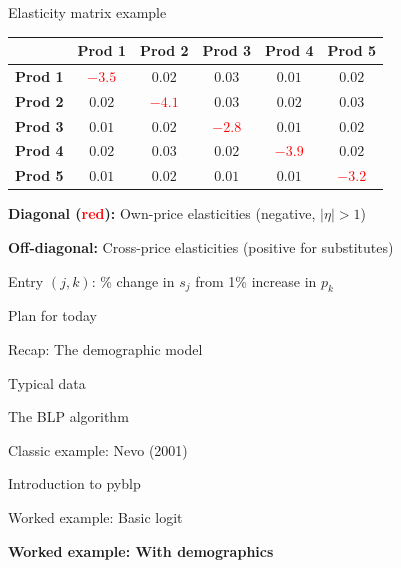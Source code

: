 \documentclass[notes,11pt, aspectratio=169]{beamer}
\newenvironment{wideitemize}{\itemize\addtolength{\itemsep}{10pt}}{\enditemize}
\newenvironment{wideenumerate}{\enumerate\addtolength{\itemsep}{10pt}}{\endenumerate}
\begin{document}
\begin{frame}{Elasticity matrix example}
	\begin{center}
		\small
		\begin{tabular}{l|ccccc}
			& \textbf{Prod 1} & \textbf{Prod 2} & \textbf{Prod 3} & \textbf{Prod 4} & \textbf{Prod 5} \\
			\hline
			\textbf{Prod 1} & \textcolor{red}{$-3.5$} & $0.02$ & $0.03$ & $0.01$ & $0.02$ \\
			\textbf{Prod 2} & $0.02$ & \textcolor{red}{$-4.1$} & $0.03$ & $0.02$ & $0.03$ \\
			\textbf{Prod 3} & $0.01$ & $0.02$ & \textcolor{red}{$-2.8$} & $0.01$ & $0.02$ \\
			\textbf{Prod 4} & $0.02$ & $0.03$ & $0.02$ & \textcolor{red}{$-3.9$} & $0.02$ \\
			\textbf{Prod 5} & $0.01$ & $0.02$ & $0.01$ & $0.01$ & \textcolor{red}{$-3.2$} \\
		\end{tabular}
	\end{center}
	\vspace{5pt}
	\begin{wideitemize}
		\item \textbf{Diagonal (\textcolor{red}{red}):} Own-price elasticities (negative, $|\eta| > 1$)
		\item \textbf{Off-diagonal:} Cross-price elasticities (positive for substitutes)
		\item Entry $(j,k)$: \% change in $s_j$ from 1\% increase in $p_k$
	\end{wideitemize}
\end{frame}

\begin{frame}{Plan for today}
  \begin{wideenumerate}
    \item Recap: The demographic model
    \item Typical data
    \item The BLP algorithm
    \item Classic example: Nevo (2001)
    \item Introduction to pyblp
    \item Worked example: Basic logit
    \item \textbf{Worked example: With demographics}
  \end{wideenumerate}
\end{frame}
\end{document}
